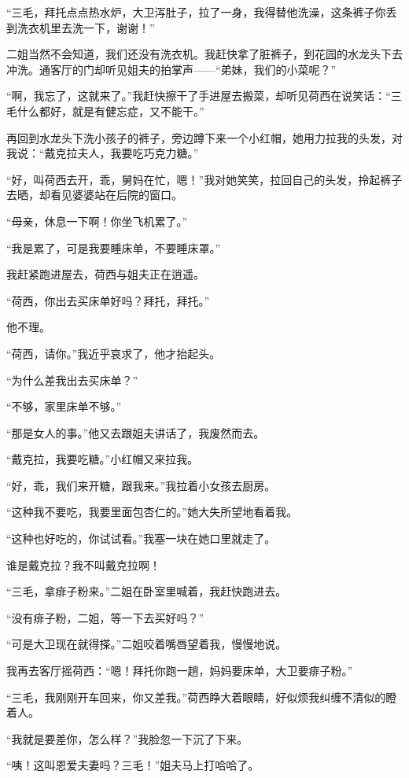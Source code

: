 \par “三毛，拜托点点热水炉，大卫泻肚子，拉了一身，我得替他洗澡，这条裤子你丢到洗衣机里去洗一下，谢谢！”
\par 二姐当然不会知道，我们还没有洗衣机。我赶快拿了脏裤子，到花园的水龙头下去冲洗。通客厅的门却听见姐夫的拍掌声——“弟妹，我们的小菜呢？”
\par “啊，我忘了，这就来了。”我赶快擦干了手进屋去搬菜，却听见荷西在说笑话：“三毛什么都好，就是有健忘症，又不能干。”
\par 再回到水龙头下洗小孩子的裤子，旁边蹲下来一个小红帽，她用力拉我的头发，对我说：“戴克拉夫人，我要吃巧克力糖。”
\par “好，叫荷西去开，乖，舅妈在忙，嗯！”我对她笑笑，拉回自己的头发，拎起裤子去晒，却看见婆婆站在后院的窗口。
\par “母亲，休息一下啊！你坐飞机累了。”
\par “我是累了，可是我要睡床单，不要睡床罩。”
\par 我赶紧跑进屋去，荷西与姐夫正在逍遥。
\par “荷西，你出去买床单好吗？拜托，拜托。”
\par 他不理。
\par “荷西，请你。”我近乎哀求了，他才抬起头。
\par “为什么差我出去买床单？”
\par “不够，家里床单不够。”
\par “那是女人的事。”他又去跟姐夫讲话了，我废然而去。
\par “戴克拉，我要吃糖。”小红帽又来拉我。
\par “好，乖，我们来开糖，跟我来。”我拉着小女孩去厨房。
\par “这种我不要吃，我要里面包杏仁的。”她大失所望地看着我。
\par “这种也好吃的，你试试看。”我塞一块在她口里就走了。
\par 谁是戴克拉？我不叫戴克拉啊！
\par “三毛，拿痱子粉来。”二姐在卧室里喊着，我赶快跑进去。
\par “没有痱子粉，二姐，等一下去买好吗？”
\par “可是大卫现在就得搽。”二姐咬着嘴唇望着我，慢慢地说。
\par 我再去客厅摇荷西：“嗯！拜托你跑一趟，妈妈要床单，大卫要痱子粉。”
\par “三毛，我刚刚开车回来，你又差我。”荷西睁大着眼睛，好似烦我纠缠不清似的瞪着人。
\par “我就是要差你，怎么样？”我脸忽一下沉了下来。
\par “咦！这叫恩爱夫妻吗？三毛！”姐夫马上打哈哈了。
